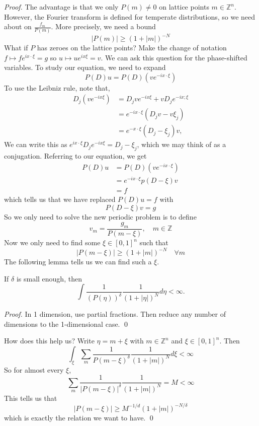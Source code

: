 \begin{proof}
The advantage is that we only $P(m) \neq 0$ on lattice points $m \in \mathbb{Z}^{n}$. However, the Fourier transform is defined for temperate distributions, so we need about on $\frac{f_{m}}{P(m)}$. More precisely, we need a bound
$$
|P(m)| \geq(1+|m|)^{-N}
$$
What if $P$ has zeroes on the lattice points? Make the change of notation $f \mapsto f e^{i x \cdot \xi}=g$ so $u \mapsto u e^{i x \xi}=v$. We can ask this question for the phase-shifted variables. To study our equation, we need to expand
$$
P(D) u=P(D)\left(v e^{-i x \cdot \xi}\right)
$$
To use the Leibniz rule, note that,
$$
\begin{aligned}
D_{j}\left(v e^{-i x \xi}\right) &=D_j v e^{-i x \xi}+v D_{j} e^{-i x ; \xi} \\
&=e^{-i x \cdot \xi}\left(D_{j} v-v \xi_{j}\right)\\
& = e^{-x\cdot \xi}(D_j -\xi_j)v,
\end{aligned}
$$
We can write this as $e^{i x \cdot \xi} D_{j} e^{-i x \xi}=D_{j}-\xi_{j}$, which we may think of as a conjugation. Referring to our equation, we get
\[
\begin{aligned}
    P(D) u &=P(D)(ve^{-ix\cdot \xi})\\
    &=e^{-i x \cdot \xi} p(D-\xi) v \\
    &=f
    \end{aligned}
\]
which tells us that we have replaced $P(D) u=f$ with
$$
P(D-\xi) v=g
$$
So we only need to solve the new periodic problem is to define
$$
v_{m}=\frac{g_{m}}{P(m-\xi)}, \quad m \in \mathbb{Z}
$$
Now we only need to find some $\xi \in[0,1]^{n}$ such that
$$
|P(m-\xi)| \geq(1+|m|)^{-N} \quad \forall m
$$
The following lemma tells us we can find such a $\xi$.

\begin{lemma}
    If $\delta$ is small enough, then
$$
\int \frac{1}{(P(\eta))^{\delta}} \frac{1}{(1+|\eta|)^{N}} d \eta<\infty .
$$
\end{lemma}
\begin{proof}
     In 1 dimension, use partial fractions. Then reduce any number of dimensions to the 1-dimensional case.
    \qed 
\end{proof}

\vspace{2em}
How does this help us? Write $\eta=m+\xi$ with $m \in \mathbb{Z}^{n}$ and $\xi \in[0,1]^{n}$. Then
$$
\int_{\xi} \sum_{m} \frac{1}{P(m-\xi)^{\delta}} \frac{1}{(1+|m|)^{N}} d \xi<\infty
$$
So for almost every $\xi$,
$$
\sum_{m} \frac{1}{|P(m-\xi)|^{\delta}} \frac{1}{(1+|m|)^{N}}=M<\infty
$$
This tells us that
$$
|P(m-\xi)| \geq M^{-1 / d}(1+|m|)^{-N / \delta}
$$
which is exactly the relation we want to have.
\qed 
\end{proof}